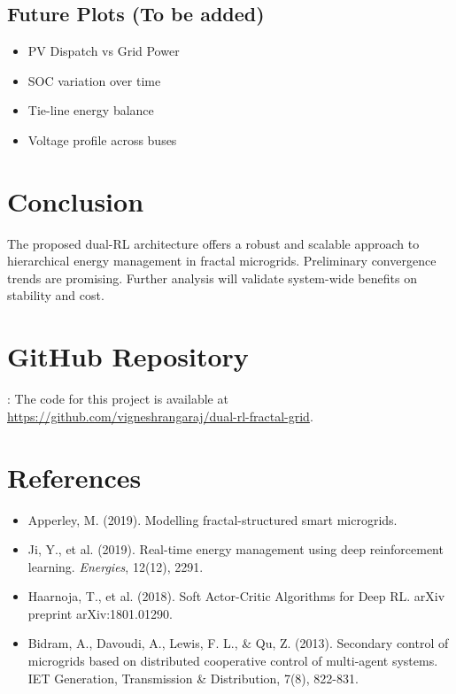 \documentclass[11pt]{article}
\begin{document}
\subsection{Future Plots (To be added)}
\begin{itemize}
  \item PV Dispatch vs Grid Power
  \item SOC variation over time
  \item Tie-line energy balance
  \item Voltage profile across buses
\end{itemize}

\section{Conclusion}
The proposed dual-RL architecture offers a robust and scalable approach to hierarchical energy management in fractal microgrids. Preliminary convergence trends are promising. Further analysis will validate system-wide benefits on stability and cost.

\section{GitHub Repository}:
The code for this project is available at \url{https://github.com/vigneshrangaraj/dual-rl-fractal-grid}.

\section*{References}
\begin{itemize}
  \item Apperley, M. (2019). Modelling fractal-structured smart microgrids.
  \item Ji, Y., et al. (2019). Real-time energy management using deep reinforcement learning. \textit{Energies}, 12(12), 2291.
  \item Haarnoja, T., et al. (2018). Soft Actor-Critic Algorithms for Deep RL. arXiv preprint arXiv:1801.01290.
  \item Bidram, A., Davoudi, A., Lewis, F. L., & Qu, Z. (2013). Secondary control of microgrids based on distributed cooperative control of multi‐agent systems. IET Generation, Transmission & Distribution, 7(8), 822-831.
\end{itemize}
\end{document}
